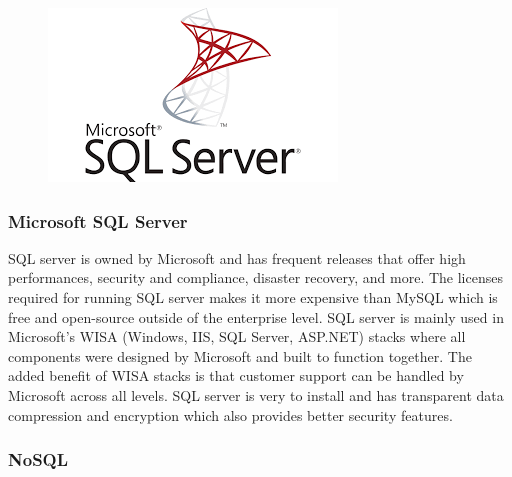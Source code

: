 \documentclass[12pt]{article}
\begin{document}
\begin{figure}[h]
	\centering
	\includegraphics[width=0.251\linewidth]{microsoftsql}
\end{figure}

\subsubsection{Microsoft SQL Server}

SQL server is owned by Microsoft and has frequent releases that offer high performances, security and compliance, disaster recovery, and more.\cite{microsoftsql}  The licenses required for running SQL server makes it more expensive than MySQL which is free and open-source outside of the enterprise level.  SQL server is mainly used in Microsoft’s WISA (Windows, IIS, SQL Server, ASP.NET) stacks where all components were designed by Microsoft and built to function together.  The added benefit of WISA stacks is that customer support can be handled by Microsoft across all levels.  SQL server is very to install and has transparent data compression and encryption which also provides better security features.

\subsubsection{NoSQL}
\end{document}

